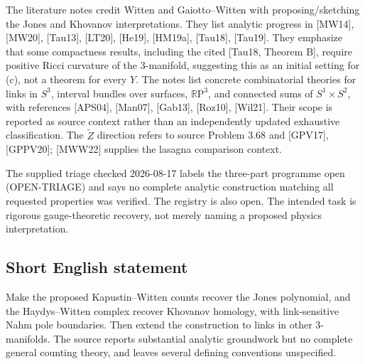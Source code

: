 \documentclass[11pt]{article}
\newcommand{\R}{\mathbb{R}}
\begin{document}
The literature notes credit Witten and Gaiotto--Witten with proposing/sketching the Jones and Khovanov interpretations. They list analytic progress in [MW14], [MW20], [Tau13], [LT20], [He19], [HM19a], [Tau18], [Tau19]. They emphasize that some compactness results, including the cited [Tau18, Theorem B], require positive Ricci curvature of the $3$-manifold, suggesting this as an initial setting for (c), not a theorem for every $Y$. The notes list concrete combinatorial theories for links in $S^3$, interval bundles over surfaces, $\R\mathrm P^3$, and connected sums of $S^1\times S^2$, with references [APS04], [Man07], [Gab13], [Roz10], [Wil21]. Their scope is reported as source context rather than an independently updated exhaustive classification. The $\widetilde Z$ direction refers to source Problem 3.68 and [GPV17], [GPPV20]; [MWW22] supplies the lasagna comparison context.

The supplied triage checked 2026-08-17 labels the three-part programme open (OPEN-TRIAGE) and says no complete analytic construction matching all requested properties was verified. The registry is also open. The intended task is rigorous gauge-theoretic recovery, not merely naming a proposed physics interpretation.
\subsection{Short English statement}
Make the proposed Kapustin--Witten counts recover the Jones polynomial, and the Haydys--Witten complex recover Khovanov homology, with link-sensitive Nahm pole boundaries. Then extend the construction to links in other $3$-manifolds. The source reports substantial analytic groundwork but no complete general counting theory, and leaves several defining conventions unspecified.
\end{document}
